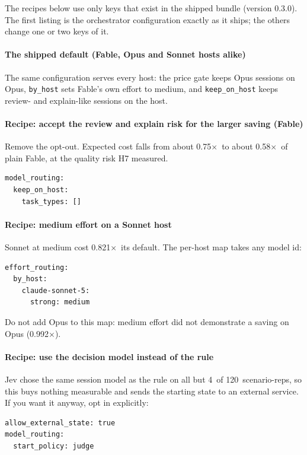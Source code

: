\documentclass[11pt,letterpaper]{article}
\newcommand{\code}[1]{\texttt{#1}}
\newcommand{\X}{\ensuremath{\times}}
\newcommand{\BundleVersion}{0.3.0}
\newcommand{\EcRatio}{0.821}
\newcommand{\KpProxyTwo}{0.75}
\newcommand{\KpRstarTwo}{0.58}
\newcommand{\SHFourRatio}{0.992}
\newcommand{\SHTwoDisc}{4}
\newcommand{\SHTwoReps}{120}
\begin{document}
The recipes below use only keys that exist in the shipped bundle (version \BundleVersion). The first listing is the
orchestrator configuration exactly as it ships; the others change one or two keys of it.

\paragraph{The shipped default (Fable, Opus and Sonnet hosts alike)} The same configuration serves every host: the
price gate keeps Opus sessions on Opus, \code{by\_host} sets Fable's own effort to medium, and \code{keep\_on\_host}
keeps review- and explain-like sessions on the host.\par
{\small
}

\paragraph{Recipe: accept the review and explain risk for the larger saving (Fable)} Remove the opt-out. Expected
cost falls from about \KpProxyTwo\X\ to about \KpRstarTwo\X\ of plain Fable, at the quality risk H7 measured.
\begin{lstlisting}[basicstyle=\ttfamily\footnotesize, frame=single, rulecolor=\color{okgray}]
model_routing:
  keep_on_host:
    task_types: []
\end{lstlisting}

\paragraph{Recipe: medium effort on a Sonnet host} Sonnet at medium cost \EcRatio\X\ its default. The per-host map
takes any model id:
\begin{lstlisting}[basicstyle=\ttfamily\footnotesize, frame=single, rulecolor=\color{okgray}]
effort_routing:
  by_host:
    claude-sonnet-5:
      strong: medium
\end{lstlisting}
Do not add Opus to this map: medium effort did not demonstrate a saving on Opus (\SHFourRatio\X).

\paragraph{Recipe: use the decision model instead of the rule} Jev chose the same session model as the rule on all
but \SHTwoDisc\ of \SHTwoReps\ scenario-reps, so this buys nothing measurable and sends the starting state to an
external service. If you want it anyway, opt in explicitly:
\begin{lstlisting}[basicstyle=\ttfamily\footnotesize, frame=single, rulecolor=\color{okgray}]
allow_external_state: true
model_routing:
  start_policy: judge
\end{lstlisting}
\end{document}
